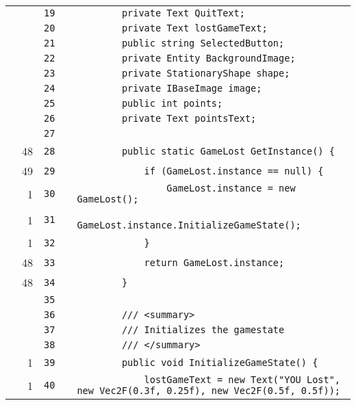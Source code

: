 \documentclass[a4paper,landscape,10pt]{article}
\begin{document}
\begin{longtable}[l]{lrrll}
\cellcolor{gray} &  & \verb~19~ & & \verb~        private Text QuitText;~\\
\cellcolor{gray} &  & \verb~20~ & & \verb~        private Text lostGameText;~\\
\cellcolor{gray} &  & \verb~21~ & & \verb~        public string SelectedButton;~\\
\cellcolor{gray} &  & \verb~22~ & & \verb~        private Entity BackgroundImage;~\\
\cellcolor{gray} &  & \verb~23~ & & \verb~        private StationaryShape shape;~\\
\cellcolor{gray} &  & \verb~24~ & & \verb~        private IBaseImage image;~\\
\cellcolor{gray} &  & \verb~25~ & & \verb~        public int points;~\\
\cellcolor{gray} &  & \verb~26~ & & \verb~        private Text pointsText;~\\
\cellcolor{gray} &  & \verb~27~ & & \verb~~\\
\cellcolor{green} & 48 & \verb~28~ & & \verb~        public static GameLost GetInstance() {~\\
\cellcolor{green} & 49 & \verb~29~ & & \verb~            if (GameLost.instance == null) {~\\
\cellcolor{green} & 1 & \verb~30~ & & \verb~                GameLost.instance = new GameLost();~\\
\cellcolor{green} & 1 & \verb~31~ & & \verb~                GameLost.instance.InitializeGameState();~\\
\cellcolor{green} & 1 & \verb~32~ & & \verb~            }~\\
\cellcolor{green} & 48 & \verb~33~ & & \verb~            return GameLost.instance;~\\
\cellcolor{green} & 48 & \verb~34~ & & \verb~        }~\\
\cellcolor{gray} &  & \verb~35~ & & \verb~~\\
\cellcolor{gray} &  & \verb~36~ & & \verb~        /// <summary>~\\
\cellcolor{gray} &  & \verb~37~ & & \verb~        /// Initializes the gamestate~\\
\cellcolor{gray} &  & \verb~38~ & & \verb~        /// </summary>~\\
\cellcolor{green} & 1 & \verb~39~ & & \verb~        public void InitializeGameState() {~\\
\cellcolor{green} & 1 & \verb~40~ & & \verb~            lostGameText = new Text("YOU Lost", new Vec2F(0.3f, 0.25f), new Vec2F(0.5f, 0.5f));~\\

\end{longtable}
\end{document}
